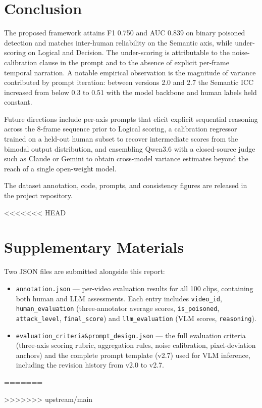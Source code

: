 \documentclass[letterpaper]{article}
\begin{document}
\section{Conclusion}
The proposed framework attains F1 0.750 and AUC 0.839 on binary
poisoned detection and matches inter-human reliability on the
Semantic axis, while under-scoring on Logical and Decision. The under-scoring is
attributable to the noise-calibration clause in the prompt and to
the absence of explicit per-frame temporal narration. A notable
empirical observation is the magnitude of variance contributed by
prompt iteration: between versions 2.0 and 2.7 the Semantic ICC
increased from below 0.3 to 0.51 with the model backbone and human
labels held constant.

Future directions include per-axis prompts that elicit explicit
sequential reasoning across the 8-frame sequence prior to Logical
scoring, a calibration regressor trained on a held-out human subset
to recover intermediate scores from the bimodal output distribution,
and ensembling Qwen3.6 with a closed-source judge such as Claude or
Gemini to obtain cross-model variance estimates beyond the reach of
a single open-weight model.

The dataset annotation, code, prompts, and consistency figures are
released in the project repository.

<<<<<<< HEAD
\section*{Supplementary Materials}
Two JSON files are submitted alongside this report:
\begin{itemize}
  \item \texttt{annotation.json} --- per-video evaluation results
        for all 100 clips, containing both human and LLM assessments.
        Each entry includes \texttt{video\_id},
        \texttt{human\_evaluation} (three-annotator average scores,
        \texttt{is\_poisoned}, \texttt{attack\_level},
        \texttt{final\_score}) and \texttt{llm\_evaluation}
        (VLM scores, \texttt{reasoning}).
  \item \texttt{evaluation\_criteria\&prompt\_design.json} ---
        the full evaluation criteria (three-axis scoring rubric,
        aggregation rules, noise calibration, pixel-deviation anchors)
        and the complete prompt template (v2.7) used for VLM inference,
        including the revision history from v2.0 to v2.7.
\end{itemize}

=======

>>>>>>> upstream/main

\end{document}
